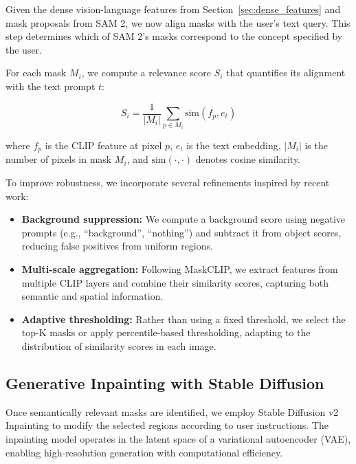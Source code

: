 Given the dense vision-language features from Section~\ref{sec:dense_features} and mask proposals from SAM 2, we now align masks with the user's text query. This step determines which of SAM 2's masks correspond to the concept specified by the user.

For each mask $M_i$, we compute a relevance score $S_i$ that quantifies its alignment with the text prompt $t$:

\begin{equation}
S_i = \frac{1}{|M_i|} \sum_{p \in M_i} \text{sim}(f_p, e_t)
\end{equation}

where $f_p$ is the CLIP feature at pixel $p$, $e_t$ is the text embedding, $|M_i|$ is the number of pixels in mask $M_i$, and $\text{sim}(\cdot, \cdot)$ denotes cosine similarity.

To improve robustness, we incorporate several refinements inspired by recent work:

\begin{itemize}
    \item \textbf{Background suppression:} We compute a background score using negative prompts (e.g., ``background'', ``nothing'') and subtract it from object scores, reducing false positives from uniform regions.

    \item \textbf{Multi-scale aggregation:} Following MaskCLIP, we extract features from multiple CLIP layers and combine their similarity scores, capturing both semantic and spatial information.

    \item \textbf{Adaptive thresholding:} Rather than using a fixed threshold, we select the top-K masks or apply percentile-based thresholding, adapting to the distribution of similarity scores in each image.
\end{itemize}

\subsection{Generative Inpainting with Stable Diffusion}

Once semantically relevant masks are identified, we employ Stable Diffusion v2 Inpainting \cite{rombach2022high} to modify the selected regions according to user instructions. The inpainting model operates in the latent space of a variational autoencoder (VAE), enabling high-resolution generation with computational efficiency.

